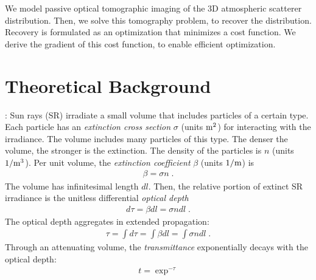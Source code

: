 \documentclass[10pt,twocolumn,letterpaper]{article}
\begin{document}
We model passive optical tomographic imaging of the 3D atmospheric scatterer distribution. Then, we solve this tomography problem, to recover the distribution. Recovery is formulated as an optimization that minimizes a cost function. We derive the gradient of this cost function, to enable efficient optimization.


\section{Theoretical Background}
\label{sec:back}
 \vspace{-0.2cm}

:
Sun rays (SR) irradiate a small volume that includes particles of a certain type.
Each particle has an {\em extinction cross section} $\sigma$ (units ${\rm m}^2$)
for interacting with the irradiance. The volume includes
many particles of this type. The denser the volume, the stronger is the extinction.
The density of the particles is $n$ (units $1/{\rm m}^3$). Per unit volume, the {\em extinction coefficient} $\beta$ (units $1/{\rm m}$) is
\begin{align}
  \beta= \sigma n
  \;.
  \label{eq:extinctc}
\end{align}
The volume has infinitesimal length $dl$. Then, the relative portion of extinct SR irradiance is the unitless differential {\em optical depth}
\begin{align}
  d\tau= \beta dl=\sigma n dl
  \;.
  \label{eq:extinct}
\end{align}
The optical depth aggregates in extended propagation:
\begin{align}
  \tau= \int d\tau=\int \beta dl=\int \sigma n dl
  \;.
  \label{eq:tau}
\end{align}
Through an attenuating volume, the {\em transmittance} exponentially decays with the optical depth:
\begin{align}
  t=\exp^{-\tau}
  \label{eq:beer-lambert}
\end{align}
\end{document}
